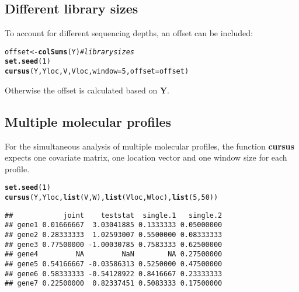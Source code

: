 \documentclass{article}\usepackage[]{graphicx}\usepackage[]{color}
\makeatletter
\newcommand{\hlnum}[1]{\textcolor[rgb]{0.686,0.059,0.569}{#1}}%
\newcommand{\hlcom}[1]{\textcolor[rgb]{0.678,0.584,0.686}{\textit{#1}}}%
\newcommand{\hlstd}[1]{\textcolor[rgb]{0.345,0.345,0.345}{#1}}%
\newcommand{\hlkwb}[1]{\textcolor[rgb]{0.69,0.353,0.396}{#1}}%
\newcommand{\hlkwc}[1]{\textcolor[rgb]{0.333,0.667,0.333}{#1}}%
\newcommand{\hlkwd}[1]{\textcolor[rgb]{0.737,0.353,0.396}{\textbf{#1}}}%
\newenvironment{kframe}{%
 \def\at@end@of@kframe{}%
 \ifinner\ifhmode%
  \def\at@end@of@kframe{\end{minipage}}%
  \begin{minipage}{\columnwidth}%
 \fi\fi%
 \def\FrameCommand##1{\hskip\@totalleftmargin \hskip-\fboxsep
 \colorbox{shadecolor}{##1}\hskip-\fboxsep
     \hskip-\linewidth \hskip-\@totalleftmargin \hskip\columnwidth}%
 \MakeFramed {\advance\hsize-\width
   \@totalleftmargin\z@ \linewidth\hsize
   \@setminipage}}%
 {\par\unskip\endMakeFramed%
 \at@end@of@kframe}
\newenvironment{knitrout}{}{} %
\makeatother
\begin{document}
\subsection{Different library sizes}
\label{GWA Different library sizes}

To account for different sequencing depths, an offset can be included:
\begin{knitrout}
\color{fgcolor}\begin{kframe}
\begin{alltt}
\hlstd{offset} \hlkwb{<-} \hlkwd{colSums}\hlstd{(Y)} \hlcom{# library sizes}
\hlkwd{set.seed}\hlstd{(}\hlnum{1}\hlstd{)}
\hlkwd{cursus}\hlstd{(Y,Yloc,V,Vloc,}\hlkwc{window}\hlstd{=}\hlnum{5}\hlstd{,}\hlkwc{offset}\hlstd{=offset)}
\end{alltt}
\end{kframe}
\end{knitrout}
Otherwise the offset is calculated based on $\boldsymbol{Y}$.

\newpage

\subsection{Multiple molecular profiles}
\label{GWA Multiple molecular profiles}

For the simultaneous analysis of multiple molecular profiles, the function \textbf{cursus} expects one covariate matrix, one location vector and one window size for each profile.

\begin{knitrout}
\color{fgcolor}\begin{kframe}
\begin{alltt}
\hlkwd{set.seed}\hlstd{(}\hlnum{1}\hlstd{)}
\hlkwd{cursus}\hlstd{(Y,Yloc,}\hlkwd{list}\hlstd{(V,W),}\hlkwd{list}\hlstd{(Vloc,Wloc),}\hlkwd{list}\hlstd{(}\hlnum{5}\hlstd{,}\hlnum{50}\hlstd{))}
\end{alltt}
\begin{verbatim}
##            joint    teststat  single.1   single.2
## gene1 0.01666667  3.03041885 0.1333333 0.05000000
## gene2 0.28333333  1.02593007 0.5500000 0.08333333
## gene3 0.77500000 -1.00030785 0.7583333 0.62500000
## gene4         NA         NaN        NA 0.27500000
## gene5 0.54166667 -0.03586313 0.5250000 0.47500000
## gene6 0.58333333 -0.54128922 0.8416667 0.23333333
## gene7 0.22500000  0.82337451 0.5083333 0.17500000
\end{verbatim}
\end{kframe}
\end{knitrout}
\end{document}
